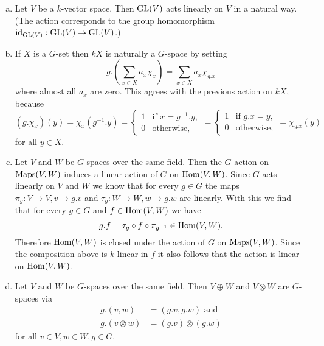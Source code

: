 \begin{expls}
 \begin{enumerate}[a)]
  \item
   Let $V$ be a $k$-vector space. Then $\operatorname{GL}(V)$ acts linearly on $V$ in a natural way. (The action corresponds to the group homomorphism $\operatorname{id}_{\operatorname{GL}(V)} : \operatorname{GL}(V) \to \operatorname{GL}(V)$.)
  \item
   If $X$ is a $G$-set then $kX$ is naturally a $G$-space by setting
   \[
    g.\left(\sum_{x \in X} a_x \chi_x\right) = \sum_{x \in X} a_x \chi_{g.x}
   \]
   where almost all $a_x$ are zero. This agrees with the previous action on $kX$, because
   \[
    (g.\chi_x)(y)
    = \chi_x(g^{-1}.y)
    = \begin{cases} 1 & \text{if } x = g^{-1}.y, \\ 0 & \text{otherwise}, \end{cases}
    = \begin{cases} 1 & \text{if } g.x = y, \\ 0 & \text{otherwise}, \end{cases}
    = \chi_{g.x}(y)
   \]
   for all $y \in X$.
  \item
   Let $V$ and $W$ be $G$-spaces over the same field. Then the $G$-action on $\operatorname{Maps}(V,W)$ induces a linear action of $G$ on $\operatorname{Hom}(V,W)$. Since $G$ acts linearly on $V$ and $W$ we know that for every $g \in G$ the maps $\pi_g : V \to V, v \mapsto g.v$ and $\tau_g : W \to W, w \mapsto g.w$ are linearly. With this we find that for every $g \in G$ and $f \in \operatorname{Hom}(V,W)$ we have
   \[
    g.f = \tau_g \circ f \circ \pi_{g^{-1}} \in \operatorname{Hom}(V,W).
   \]
   Therefore $\operatorname{Hom}(V,W)$ is closed under the action of $G$ on $\operatorname{Maps}(V,W)$. Since the composition above is $k$-linear in $f$ it also follows that the action is linear on $\operatorname{Hom}(V,W)$.
  \item
   Let $V$ and $W$ be $G$-spaces over the same field. Then $V \oplus W$ and $V \otimes W$ are $G$-spaces via
   \begin{align*}
    g.(v,w) &= (g.v,g.w) \text{ and }  \tag{1} \\
    g.(v \otimes w) &= (g.v) \otimes (g.w) \tag{2}
   \end{align*}
   for all $v \in V, w \in W, g \in G$.
 \end{enumerate}
 

\end{expls}
